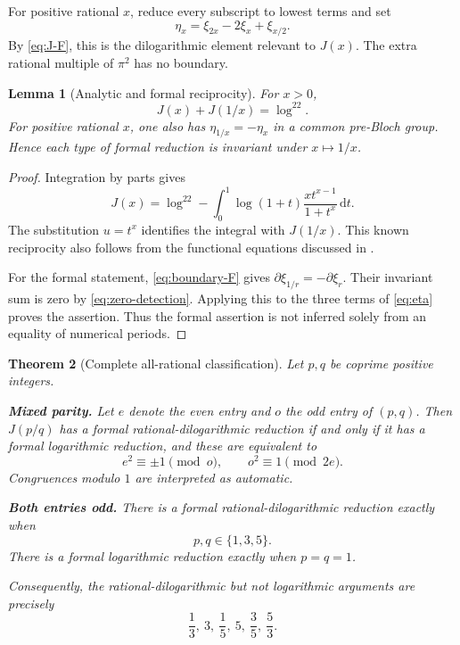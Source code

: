 \documentclass[11pt]{article}
\numberwithin{equation}{section}
\newtheorem{theorem}{Theorem}[section]
\newtheorem{lemma}[theorem]{Lemma}
\theoremstyle{definition}
\theoremstyle{remark}
\newcommand{\dd}{\,\mathrm d}
\begin{document}
For positive rational $x$, reduce every subscript to lowest terms and set
\begin{equation}\label{eq:eta}
 \eta_x=\xi_{2x}-2\xi_x+\xi_{x/2}.
\end{equation}
By \eqref{eq:J-F}, this is the dilogarithmic element relevant to $J(x)$.
The extra rational multiple of $\pi^2$ has no boundary.

\begin{lemma}[Analytic and formal reciprocity]\label{lem:reciprocity}
For $x>0$,
\begin{equation}\label{eq:J-reciprocity}
 J(x)+J(1/x)=\log^22.
\end{equation}
For positive rational $x$, one also has $\eta_{1/x}=-\eta_x$ in a
common pre-Bloch group. Hence each type of formal reduction is invariant
under $x\mapsto1/x$.
\end{lemma}
\begin{proof}
Integration by parts gives
\[
 J(x)=\log^22-\int_0^1
       \log(1+t)\frac{x t^{x-1}}{1+t^x}\dd t.
\]
The substitution $u=t^x$ identifies the integral with $J(1/x)$. This
known reciprocity also follows from the functional equations discussed
in \cite{CK}.

For the formal statement, \eqref{eq:boundary-F} gives
$\partial\xi_{1/r}=-\partial\xi_r$. Their invariant sum is zero by
\eqref{eq:zero-detection}. Applying this to the three terms of
\eqref{eq:eta} proves the assertion. Thus the formal assertion is not
inferred solely from an equality of numerical periods.
\end{proof}

\begin{theorem}[Complete all-rational classification]\label{thm:classification}
Let $p,q$ be coprime positive integers.

\smallskip\noindent
\textbf{Mixed parity.} Let $e$ denote the even entry and $o$ the odd entry
of $(p,q)$. Then $J(p/q)$ has a formal rational-dilogarithmic reduction
if and only if it has a formal logarithmic reduction, and these are
equivalent to
\begin{equation}\label{eq:mixed-class}
 \boxed{\quad e^2\equiv\pm1\pmod o,
 \qquad o^2\equiv1\pmod{2e}.\quad}
\end{equation}
Congruences modulo $1$ are interpreted as automatic.

\smallskip\noindent
\textbf{Both entries odd.} There is a formal rational-dilogarithmic
reduction exactly when
\begin{equation}\label{eq:odd-class}
 p,q\in\{1,3,5\}.
\end{equation}
There is a formal logarithmic reduction exactly when $p=q=1$.

\smallskip\noindent
Consequently, the rational-dilogarithmic but not logarithmic arguments
are precisely
\begin{equation}\label{eq:six-extras}
 \boxed{\quad\frac13,\ 3,\ \frac15,\ 5,\ \frac35,\ \frac53.\quad}
\end{equation}
\end{theorem}
\end{document}
